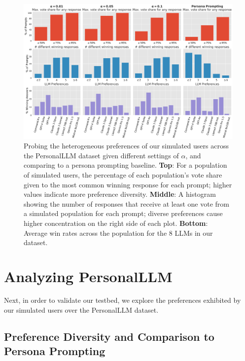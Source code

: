 \begin{figure}[!ht]
    \centering 
    \includegraphics[width=\linewidth]{figures/persona_prompting_comparison.png}
    \caption{Probing the heterogeneous preferences of our simulated users across the \textsf{PersonalLLM} dataset given different settings of $\alpha$, and comparing to a persona prompting baseline.  \textbf{Top}: For a population of simulated users, the percentage of each population's vote share given to the most common winning response for each prompt; higher values indicate more preference diversity. \textbf{Middle}: A histogram showing the number of responses that receive at least one vote from a simulated population for each prompt; diverse preferences cause higher concentration on the right side of each plot. \textbf{Bottom}: Average win rates across the population for the 8 LLMs in our dataset.}
    \label{fig:persona_diversity}
\end{figure}

\section{Analyzing PersonalLLM}\label{sec:persona_analysis}

Next, in order to validate our testbed, we explore the preferences exhibited by our simulated users over the \textsf{PersonalLLM} dataset.  

\subsection{Preference Diversity and Comparison to Persona Prompting}


